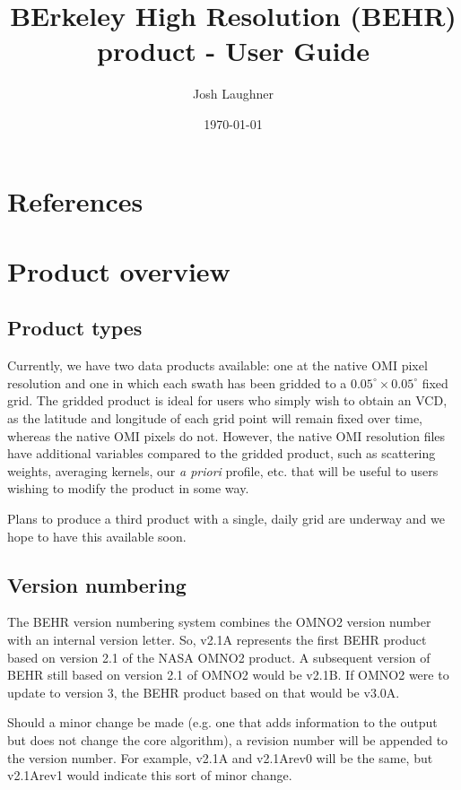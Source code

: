 \documentclass[12pt]{article}
\title{BErkeley High Resolution (BEHR) \ce{NO2} product - User Guide}
\author{Josh Laughner}
\date{\today}
\begin{document}
\maketitle

\section{References}

\section{Product overview}

	\subsection{Product types}
	Currently, we have two data products available: one at the native OMI pixel resolution and one in which each swath has been gridded to a $0.05^\circ \times 0.05^\circ$ fixed grid. The gridded product is ideal for users who simply wish to obtain an  VCD, as the latitude and longitude of each grid point will remain fixed over time, whereas the native OMI pixels do not. However, the native OMI resolution files have additional variables compared to the gridded product, such as scattering weights, averaging kernels, our  \emph{a priori} profile, etc. that will be useful to users wishing to modify the product in some way.
	
	Plans to produce a third product with a single, daily grid are underway and we hope to have this available soon.
	
	\subsection{Version numbering}
	The BEHR version numbering system combines the OMNO2 version number with an
internal version letter. So, v2.1A represents the first BEHR product based on
version 2.1 of the NASA OMNO2 product. A subsequent version of BEHR still based
on version 2.1 of OMNO2 would be v2.1B. If OMNO2 were to update to version 3,
the BEHR product based on that would be v3.0A.

	Should a minor change be made (e.g. one that adds information to the output but
does not change the core algorithm), a revision number will be appended to the
version number. For example, v2.1A and v2.1Arev0 will be the same, but v2.1Arev1
would indicate this sort of minor change.
	
\end{document}
